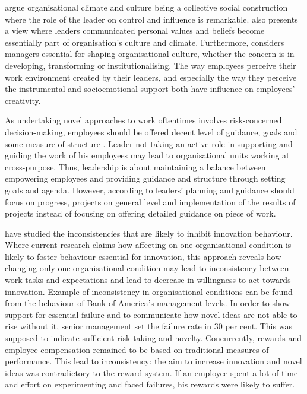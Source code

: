 \citep{mumford2002leading} argue organisational climate and culture being a collective social construction where the role of the leader on control and influence is remarkable. \citep{schein2010organizational} also presents a view where leaders communicated personal values and beliefs become essentially part of organisation's culture and climate. Furthermore,\citep{jung2001transformational} considers managers essential for shaping organisational culture, whether the concern is in developing, transforming or institutionalising. The way employees perceive their work environment created by their leaders, and especially the way they perceive the instrumental and socioemotional support both have influence on employees' creativity. \citep{oldham1996employee}

As undertaking novel approaches to work oftentimes involves risk-concerned decision-making, employees should be offered decent level of guidance, goals and some measure of structure \citep{jung2003role}. Leader not taking an active role in supporting and guiding the work of his employees may lead to organisational units working at cross-purpose. Thus, leadership is about maintaining a balance between empowering employees and providing guidance and structure through setting goals and agenda. However, according to \citet{mumford2002leading} leaders' planning and guidance should focus on progress, projects on general level and implementation of the results of projects instead of focusing on offering detailed guidance on piece of work. 

\citet{lee2004mixed} have studied the inconsistencies that are likely to inhibit innovation behaviour. Where current research claims how affecting on one organisational condition is likely to foster behaviour essential for innovation, this approach reveals how changing only one organisational condition may lead to inconsistency between work tasks and expectations and lead to decrease in willingness to act towards innovation. Example of inconsistency in organisational conditions can be found from the behaviour of Bank of America's management levels. In order to show support for essential failure and to communicate how novel ideas are not able to rise without it, senior management set the failure rate in 30 per cent. This was supposed to indicate sufficient risk taking and novelty. Concurrently, rewards and employee compensation remained to be based on traditional measures of performance. This lead to inconsistency: the aim to increase innovation and novel ideas was contradictory to the reward system. If an employee spent a lot of time and effort on experimenting and faced failures, his rewards were likely to suffer. \citep{lee2004mixed} 

